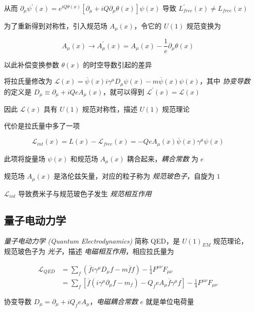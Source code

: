 从而 $\partial_\mu \psi^\prime(x)=e^{iQ\theta(x)} [\partial_\mu + iQ \partial_\mu \theta(x)] \psi(x)$ 导致 $L_{free}^\prime(x) \ne L_{free}(x)$

为了重新得到对称性，引入规范场 $A_\mu(x)$，令它的 $U(1)$ 规范变换为

\begin{equation}
    A_\mu(x) \to A^\prime_\mu(x) = A_\mu(x) - \frac{1}{e} \partial_\mu \theta(x)
\end{equation}

以此补偿变换参数 $\theta(x)$ 的时空导数引起的差异

将拉氏量修改为 $\mathcal{L}(x) = \overline{\psi}(x) i\gamma^\mu D_\mu \psi(x) - m \overline{\psi}(x) \psi(x)$，其中 \emph{协变导数} 的定义是 $D_\mu \equiv \partial_\mu + iQ e A_\mu(x)$，就可以得到 $\mathcal{L}^\prime(x) = \mathcal{L}(x)$

因此 $\mathcal{L}(x)$ 具有 $U(1)$ 规范对称性，描述 $U(1)$ 规范理论

代价是拉氏量中多了一项

\begin{equation}
    \mathcal{L}_{int}(x) = L(x) - \mathcal{L}_{free}(x) = -Q e A_\mu(x) \overline{\psi}(x) \gamma^\mu \psi(x)
\end{equation}

此项将旋量场 $\psi(x)$ 和规范场 $A_\mu(x)$ 耦合起来，\emph{耦合常数} 为 $e$

规范场 $A_\mu(x)$ 是洛伦兹矢量，对应的粒子称为 \emph{规范玻色子}，自旋为 $1$

$\mathcal{L}_{int}$ 导致费米子与规范玻色子发生 \emph{规范相互作用}

\subsection{量子电动力学}

\emph{量子电动力学 (Quantum Electrodynamics)} 简称 QED，是 $U(1)_{EM}$ 规范理论，规范玻色子为 \emph{光子}，描述 \emph{电磁相互作用}，相应拉氏量为

\begin{align}
    \mathcal{L}_{QED} &= \sum_f (\overline{f} i \gamma^\mu D_\mu f - m \overline{f} f) - \frac{1}{4} F^{\mu\nu} F_{\mu\nu} \\
    &= \sum_f \left[\overline{f} (i \gamma^\mu \partial_\mu f - m_f) - Q_f e A_\mu \overline{f}\gamma^\mu f\right] - \frac{1}{4} F^{\mu\nu} F_{\mu\nu}
\end{align}

协变导数 $D_\mu = \partial_\mu + i Q_f e A_\mu$，\emph{电磁耦合常数} $e$ 就是单位电荷量

